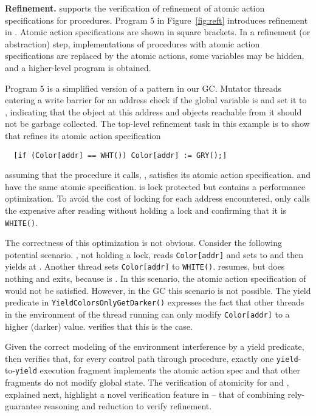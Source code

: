 %

{\bf Refinement.} 
\civl supports the verification of refinement of atomic action specifications for
procedures. Program 5 in Figure~\ref{fig:reft} introduces refinement in \civl. 
Atomic action specifications are shown in square brackets. 
In a refinement (or abstraction) step, implementations of procedures with atomic action
specifications are replaced by the atomic actions, some variables may
be hidden, and a higher-level program is obtained. 

Program 5 is a simplified version of a pattern in our GC.
Mutator threads entering a write barrier for an
address  check
if the global variable  is 
and set it to , indicating that the object at this address
and objects reachable from it should not be garbage collected. The
top-level refinement task in this example is to show that 
refines its atomic action specification 
\begin{verbatim}
  [if (Color[addr] == WHT()) Color[addr] := GRY();]
\end{verbatim}
assuming that the procedure it calls, , satisfies its
atomic action specification.  and  have the same atomic
specification.   is lock protected but  contains a
performance optimization. 
To avoid the cost of locking for each
address encountered, 
 only calls the expensive 
 after reading  without holding a lock
and confirming that it is {\tt WHITE()}.


The correctness of this
optimization is not obvious. Consider the following potential
scenario. , not holding a lock, reads {\tt Color[addr]} and
sets  to  and then yields at
. Another thread sets {\tt Color[addr]} to
{\tt WHITE()}.  resumes, but does nothing and exits,
because  is . In this scenario, the atomic action
specification of  would not be satisfied. However, in the GC this
scenario is not possible. 
The yield
predicate in {\tt YieldColorsOnlyGetDarker()} expresses the fact that
other threads in the environment of the thread running  can
only modify {\tt Color[addr]} to a higher (darker)
value. \civl verifies that this is the case. 

Given the correct
modeling of the environment interference by a yield predicate,
\civl then verifies that, for every control path through 
procedure, exactly one {\tt yield}-to-{\tt yield} execution
fragment implements the atomic action spec and that other fragments do not modify
global state. The verification of atomicity for  and
, explained next, highlight a
novel verification feature in \civl -- that of combining
rely-guarantee reasoning and reduction to verify refinement.

